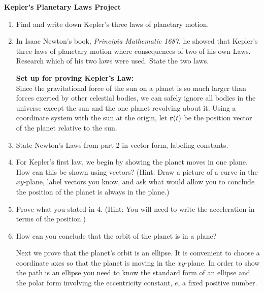 \documentclass[11pt]{article}
\newcommand{\br}{{\bf r }}
\begin{document}

\thispagestyle{plain} %


\vspace{0.3cm} %

\begin{center}
{\bf Kepler's Planetary Laws Project}\\
\end{center}

\vspace{0.1cm}
\begin{enumerate}

\item Find and write down Kepler's three laws of planetary motion.

\item In Isaac Newton's book, {\it Principia Mathematic 1687}, he showed that Kepler's three laws of planetary motion where consequences of two of his own Laws. Research which of his two laws were used. State the two laws.


{\bf Set up for proving Kepler's Law:}\\
 \noindent
Since the gravitational force of the sun on a planet is so much larger than forces exerted by other celestial bodies, we can safely ignore all bodies in the universe except the sun and the one planet revolving about it. Using a coordinate system with the sun at the origin, let $\br(t)$ be the position vector of the planet relative to the sun.

\item State Newton's Laws from part 2 in vector form, labeling constants.

\item For Kepler's first law, we begin by showing the planet moves in one plane. How can this be shown using vectors? (Hint: Draw a picture of a curve in the $xy$-plane, label vectors you know, and ask what would allow you to conclude the position of the planet is always in the plane.)

\item Prove what you stated in 4. (Hint: You will need to write the acceleration in terms of the position.)

\item How can you conclude that the orbit of the planet is in a plane?

Next we prove that the planet's orbit is an ellipse. It is convenient to choose a coordinate axes so that the planet is moving in the $xy$-plane. In order to show the path is an ellipse you need to know the standard form of an ellipse and the polar form involving the eccentricity constant, $e$, a fixed positive number.


\end{enumerate}
\end{document}

